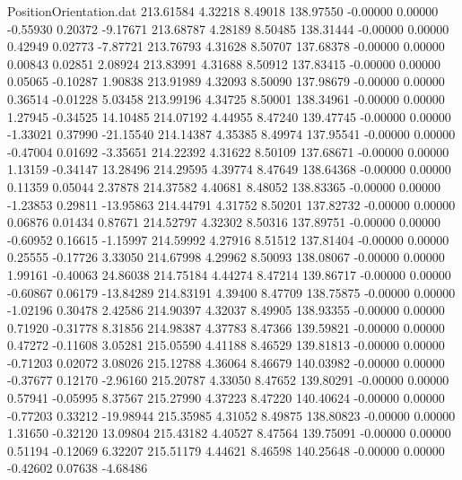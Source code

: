 \begin{filecontents}{PositionOrientation.dat}
 213.61584    4.32218    8.49018   138.97550   -0.00000    0.00000   -0.55930    0.20372   -9.17671
 213.68787    4.28189    8.50485   138.31444   -0.00000    0.00000    0.42949    0.02773   -7.87721
 213.76793    4.31628    8.50707   137.68378   -0.00000    0.00000    0.00843    0.02851    2.08924
 213.83991    4.31688    8.50912   137.83415   -0.00000    0.00000    0.05065   -0.10287    1.90838
 213.91989    4.32093    8.50090   137.98679   -0.00000    0.00000    0.36514   -0.01228    5.03458
 213.99196    4.34725    8.50001   138.34961   -0.00000    0.00000    1.27945   -0.34525   14.10485
 214.07192    4.44955    8.47240   139.47745   -0.00000    0.00000   -1.33021    0.37990  -21.15540
 214.14387    4.35385    8.49974   137.95541   -0.00000    0.00000   -0.47004    0.01692   -3.35651
 214.22392    4.31622    8.50109   137.68671   -0.00000    0.00000    1.13159   -0.34147   13.28496
 214.29595    4.39774    8.47649   138.64368   -0.00000    0.00000    0.11359    0.05044    2.37878
 214.37582    4.40681    8.48052   138.83365   -0.00000    0.00000   -1.23853    0.29811  -13.95863
 214.44791    4.31752    8.50201   137.82732   -0.00000    0.00000    0.06876    0.01434    0.87671
 214.52797    4.32302    8.50316   137.89751   -0.00000    0.00000   -0.60952    0.16615   -1.15997
 214.59992    4.27916    8.51512   137.81404   -0.00000    0.00000    0.25555   -0.17726    3.33050
 214.67998    4.29962    8.50093   138.08067   -0.00000    0.00000    1.99161   -0.40063   24.86038
 214.75184    4.44274    8.47214   139.86717   -0.00000    0.00000   -0.60867    0.06179  -13.84289
 214.83191    4.39400    8.47709   138.75875   -0.00000    0.00000   -1.02196    0.30478    2.42586
 214.90397    4.32037    8.49905   138.93355   -0.00000    0.00000    0.71920   -0.31778    8.31856
 214.98387    4.37783    8.47366   139.59821   -0.00000    0.00000    0.47272   -0.11608    3.05281
 215.05590    4.41188    8.46529   139.81813   -0.00000    0.00000   -0.71203    0.02072    3.08026
 215.12788    4.36064    8.46679   140.03982   -0.00000    0.00000   -0.37677    0.12170   -2.96160
 215.20787    4.33050    8.47652   139.80291   -0.00000    0.00000    0.57941   -0.05995    8.37567
 215.27990    4.37223    8.47220   140.40624   -0.00000    0.00000   -0.77203    0.33212  -19.98944
 215.35985    4.31052    8.49875   138.80823   -0.00000    0.00000    1.31650   -0.32120   13.09804
 215.43182    4.40527    8.47564   139.75091   -0.00000    0.00000    0.51194   -0.12069    6.32207
 215.51179    4.44621    8.46598   140.25648   -0.00000    0.00000   -0.42602    0.07638   -4.68486

\end{filecontents}
